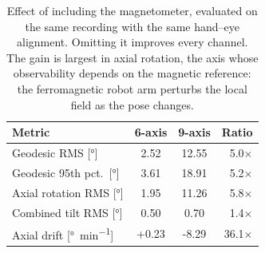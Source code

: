 \begin{table}[t]
  \centering
  \caption{Effect of including the magnetometer, evaluated on the same
  recording with the same hand--eye alignment. Omitting it improves every
  channel. The gain is largest in axial rotation, the axis whose observability
  depends on the magnetic reference: the ferromagnetic robot arm perturbs the
  local field as the pose changes.}
  \label{tab:imu-6ax-vs-9ax}
  \begin{tabular}{l S[table-format=+2.2] S[table-format=+2.2] r}
    \toprule
    Metric & {6-axis} & {9-axis} & {Ratio} \\
    \midrule
    Geodesic RMS [\si{\degree}] & 2.52 & 12.55 & 5.0$\times$ \\
    Geodesic 95th pct.\ [\si{\degree}] & 3.61 & 18.91 & 5.2$\times$ \\
    Axial rotation RMS [\si{\degree}] & 1.95 & 11.26 & 5.8$\times$ \\
    Combined tilt RMS [\si{\degree}] & 0.50 & 0.70 & 1.4$\times$ \\
    Axial drift [\si{\degree\per\minute}] & +0.23 & -8.29 & 36.1$\times$ \\
    \bottomrule
  \end{tabular}
\end{table}
